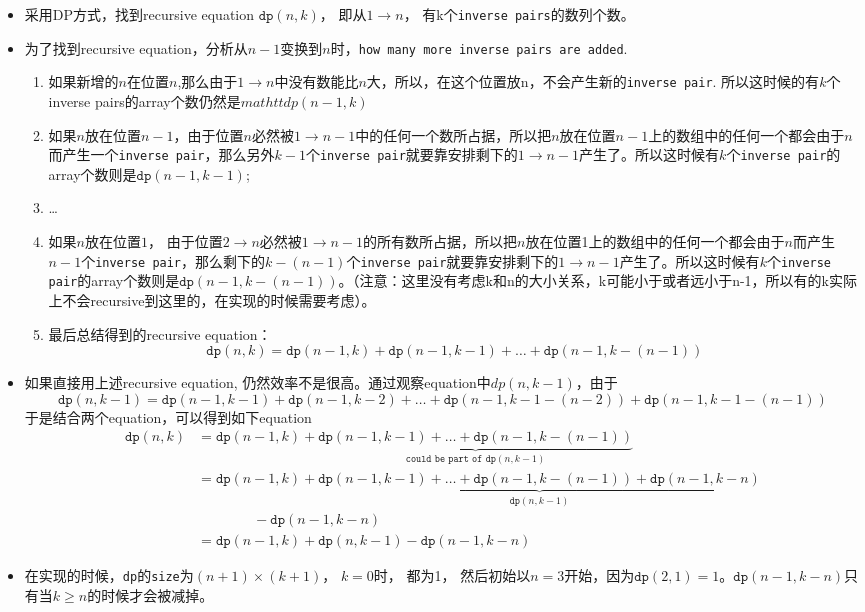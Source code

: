 \documentclass[a4paper,12pt]{article}
\begin{document}
\begin{CJK*}{UTF8}{gbsn}
	\begin{itemize}
		\item 采用DP方式，找到recursive equation $\mathtt{dp}(n, k)$， 即从$1\to n$， 有k个\texttt{inverse pairs}的数列个数。
		\item 为了找到recursive equation，分析从$n-1$变换到$n$时，\texttt{how many more inverse pairs are added}.
		\begin{enumerate}
			\item 如果新增的$n$在位置$n$,那么由于$1 \to n$中没有数能比$n$大，所以，在这个位置放n，不会产生新的\texttt{inverse pair}. 所以这时候的有$k$个inverse pairs的array个数仍然是$mathtt{dp}(n-1, k)$
			\item 如果$n$放在位置$n-1$，由于位置$n$必然被$1 \to n-1$中的任何一个数所占据，所以把$n$放在位置$n-1$上的数组中的任何一个都会由于$n$而产生一个\texttt{inverse pair}，那么另外$k-1$个\texttt{inverse pair}就要靠安排剩下的$1\to n-1$产生了。所以这时候有$k$个\texttt{inverse pair}的array个数则是$\mathtt{dp}(n-1, k-1)$;
			\item \ldots
			\item 如果$n$放在位置$1$， 由于位置$2 \to n$必然被$1 \to n-1$的所有数所占据，所以把$n$放在位置1上的数组中的任何一个都会由于$n$而产生$n-1$个\texttt{inverse pair}，那么剩下的$k-(n-1)$个\texttt{inverse pair}就要靠安排剩下的$1\to n-1$产生了。所以这时候有$k$个\texttt{inverse pair}的array个数则是$\mathtt{dp}(n-1, k-(n-1))$。（注意：这里没有考虑k和n的大小关系，k可能小于或者远小于n-1，所以有的k实际上不会recursive到这里的，在实现的时候需要考虑）。
			\item 最后总结得到的recursive equation：
			$$
			\mathtt{dp}(n, k) = \mathtt{dp}(n-1, k) + \mathtt{dp}(n-1, k-1) + \ldots + \mathtt{dp}(n-1, k-(n-1))
			$$
		\end{enumerate}
	\item 如果直接用上述recursive equation, 仍然效率不是很高。通过观察equation中$dp(n, k-1)$，由于
	$$
	\mathtt{dp}(n, k-1) = \mathtt{dp}(n-1, k-1) + \mathtt{dp}(n-1, k-2) + \ldots + \mathtt{dp}(n-1, k-1-(n-2)) + \mathtt{dp}(n-1, k-1-(n-1))
	$$
	于是结合两个equation，可以得到如下equation
	\begin{equation}
	\begin{split}
	\mathtt{dp}(n, k) &= \mathtt{dp}(n-1, k) + \underbrace{\mathtt{dp}(n-1, k-1) + \ldots + \mathtt{dp}(n-1, k-(n-1))}_{\texttt{could be part of }\mathtt{dp}(n, k-1)} \\
	&= \mathtt{dp}(n-1, k) + \underbrace{\mathtt{dp}(n-1, k-1) + \ldots + \mathtt{dp}(n-1, k-(n-1)) + \mathtt{dp}(n-1, k-n)}_{\mathtt{dp}(n, k-1)} \\
	&\qquad \qquad - \mathtt{dp}(n-1, k-n) \\
	&= \mathtt{dp}(n-1, k) + \mathtt{dp}(n, k-1) - \mathtt{dp}(n-1, k-n)
	\end{split}
	\end{equation}
	\item 在实现的时候，\texttt{dp}的\texttt{size}为$(n+1)\times(k+1)$， $k=0$时， 都为1， 然后初始以$n=3$开始，因为$\mathtt{dp}(2,1)=1$。$\mathtt{dp}(n-1, k-n)$只有当$k \geq n$的时候才会被减掉。
	\end{itemize}
	\clearpage
\end{CJK*}
\end{document}
